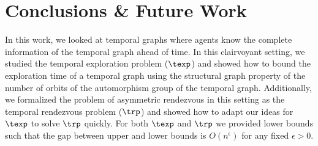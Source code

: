 {%
%
}
\section{Conclusions \& Future Work}
In this work, we looked at temporal graphs where agents know the complete
information of the temporal graph ahead of time. In this clairvoyant setting,
we studied the temporal exploration problem ($\texp$) and showed how to bound
the exploration time of a temporal graph using the structural graph property of
the number of orbits of the automorphism group of the temporal graph.
Additionally, we formalized the problem of asymmetric rendezvous in this
setting as the temporal rendezvous problem ($\trp$) and showed how to adapt our
ideas for $\texp$ to solve $\trp$ quickly. For both $\texp$ and $\trp$ we
provided lower bounds such that the gap between upper and lower bounds is
$O(n^\epsilon)$ for any fixed $\epsilon > 0$. 

